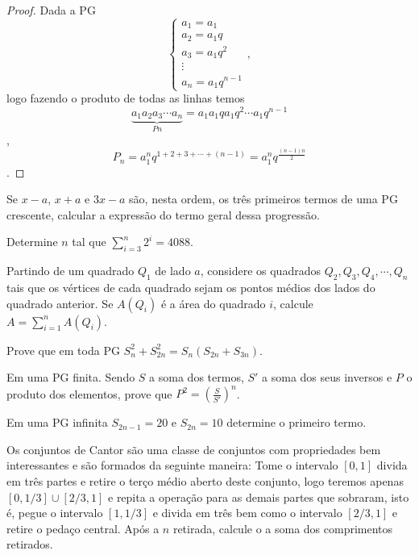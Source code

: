 \begin{proof}
Dada a PG 
\begin{equation}
    \begin{cases}
    a_1 = a_1\\
    a_2 = a_1q\\
    a_3 = a_1q^2\\
    \vdots\\
    a_n = a_1q^{n-1}
    \end{cases},
\end{equation}
logo fazendo o produto de todas as linhas temos 
$$\underbrace{a_1a_2a_3\cdots a_n}_{Pn} = a_1a_1qa_1q^2\cdots a_1q^{n-1}$$,
$$P_n = a_1^nq^{1+2+3+\cdots+(n-1)} = a_1^nq^{\frac{(n-1)n}{2}}$$.
\end{proof}

\noindent \exercicio

\noindent [1]  Se $x-a$, $x + a$ e $3x-a$ são, nesta ordem, os três primeiros termos de uma PG crescente, calcular a expressão do termo geral dessa progressão.

\vspace{.5cm}

\noindent [2] Determine $n$ tal que $\displaystyle \sum_{i=3}^{n}2^i = 4088$.

\vspace{.5cm}

\noindent [3] Partindo de um quadrado $Q_1$ de lado $a$, considere os quadrados $Q_2,Q_3,Q_4,\cdots,Q_n$ tais que os vértices de cada quadrado sejam os pontos médios dos lados do quadrado anterior. Se $A(Q_i)$ é a área do quadrado $i$, calcule $\displaystyle A = \sum_{i=1}^{n}A(Q_i)$.

\vspace{.5cm}

\noindent [4] Prove que em toda PG $S_n^2 + S_{2n}^2 = S_n(S_{2n} + S_{3n})$.

\vspace{.5cm}

\noindent [5] Em uma PG finita. Sendo $S$ a soma dos termos, $S'$ a soma dos seus inversos e $P$ o produto dos elementos, prove que $\displaystyle P^2 = \left(\frac{S}{S'}\right)^n$.

\vspace{.5cm}

\noindent [6] Em uma PG infinita $S_{2n-1} = 20$ e $S_{2n} = 10$ determine o primeiro termo.

\vspace{.5cm}

\noindent [7] Os conjuntos de Cantor são uma classe de conjuntos com propriedades bem interessantes e são formados da seguinte maneira: Tome o intervalo $[0,1]$ divida em três partes e retire o terço médio aberto deste conjunto, logo teremos apenas $[0,1/3] \cup [2/3,1]$ e repita a operação para as demais partes que sobraram, isto é, pegue o intervalo $[1,1/3]$ e divida em três bem como o intervalo $[2/3,1]$ e retire o pedaço central. Após a $n$ retirada, calcule o a soma dos comprimentos retirados.  

